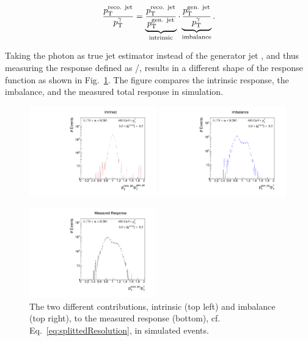 \begin{equation}\label{eq:splittedResolution}
\frac{{p}_\mathrm{T}^{\text{reco. jet}}}{{p}_\mathrm{T}^{\gamma}} = \underbrace{\frac{{p}_\mathrm{T}^{\text{reco. jet}}}{{p}_\mathrm{T}^{\text{gen. jet}}}}_{\text{intrinsic}} \cdot \underbrace{\frac{{p}_\mathrm{T}^{\text{gen. jet}}}{{p}_\mathrm{T}^{\gamma}}}_{\text{imbalance}}.
\end{equation}

Taking the photon \pt as true jet \pt estimator instead of the generator jet \pt, and thus measuring the response defined as \ptrecojet/\ptgamma, results in a different shape of the response function as shown in Fig.~\ref{fig:responseExamples}. 
The figure compares the intrinsic response, the imbalance, and the measured total response in simulation. 

\begin{figure}[t]
 \centering
     \includegraphics[width=0.49\textwidth]{figures/resolution/methodology/intrinsicExample.pdf}
     \includegraphics[width=0.49\textwidth]{figures/resolution/methodology/imbalanceExample.pdf}

     \includegraphics[width=0.49\textwidth]{figures/resolution/methodology/fullResponseExample.pdf}
  \caption{The two different contributions, intrinsic (top left) and imbalance (top right), to the measured response (bottom), 
           cf. \mbox{Eq.~\eqref{eq:splittedResolution}}, in simulated events.}  
 \label{fig:responseExamples}
\end{figure}


